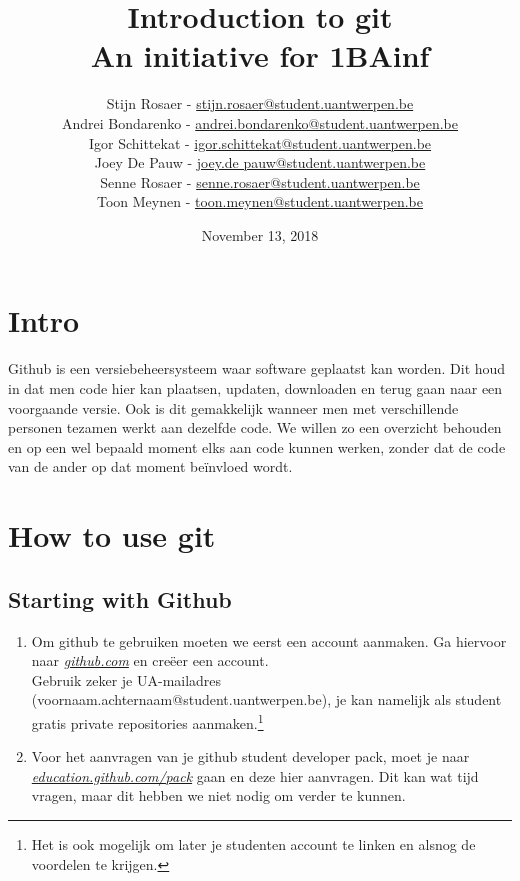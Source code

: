 \documentclass[a4paper, titlepage]{article}
\makeatletter
\newcommand*{\email}[1]{\href{mailto:#1}{#1}}
\newcommand*{\uaEmail}[2]{\email{\lowercase{#1}.\lowercase{#2}@student.uantwerpen.be}}
\newcommand*{\nameAndMail}[2]{#1 #2 - \uaEmail{#1}{#2}}
\makeatother
\begin{document}
	\title{Introduction to git\\ \large An initiative for 1BAinf}
	\date{November 13, 2018}

	\author{
		\nameAndMail{Stijn}{Rosaer} \\
		\nameAndMail{Andrei}{Bondarenko} \\
		\nameAndMail{Igor}{Schittekat} \\
		\nameAndMail{Joey}{De Pauw} \\
		\nameAndMail{Senne}{Rosaer} \\
		\nameAndMail{Toon}{Meynen}
	}
	\maketitle
	
	\tableofcontents
	\section{Intro}
		Github is een versiebeheersysteem waar software geplaatst kan worden. Dit houd in dat men code hier kan plaatsen, updaten, downloaden en terug gaan naar een voorgaande versie. Ook is dit gemakkelijk wanneer men met verschillende personen tezamen werkt aan dezelfde code. We willen zo een overzicht behouden en op een wel bepaald moment elks aan code kunnen werken, zonder dat de code van de ander op dat moment be\"invloed wordt.
	

	\pagebreak
	
	\section{How to use git}
		\subsection{Starting with Github}
			\begin{enumerate}
				\item Om github te gebruiken moeten we eerst een account aanmaken. Ga hiervoor naar \href{https://github.com/}{\textit{github.com}} en cre\"eer een account.\\	
				Gebruik zeker je UA-mailadres (voornaam.achternaam@student.uantwerpen.be), je kan namelijk als student gratis private repositories aanmaken.\footnote{Het is ook mogelijk om later je studenten account te linken en alsnog de voordelen te krijgen.}
				\item Voor het aanvragen van je github student developer pack, moet je naar  \href{https://education.github.com/pack}{\textit{education.github.com/pack}} gaan en deze hier aanvragen. Dit kan wat tijd vragen, maar dit hebben we niet nodig om verder te kunnen.
			\end{enumerate}
\end{document}
